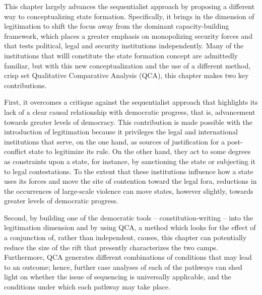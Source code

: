 \documentclass [11pt]{article}
\begin{document}
This chapter largely advances the sequentialist approach by proposing a different way to conceptualizing state formation. Specifically, it brings in the dimension of legitimation to shift the focus away from the dominant capacity-building framework, which places a greater emphasis on monopolizing security forces and that tests political, legal and security institutions independently. Many of the institutions that willl constitute the state formation concept are admittedly familiar, but with this new conceptualization and the use of a different method, crisp set Qualitative Comparative Analysis (QCA), this chapter makes two key contributions.

First, it overcomes a critique against the sequentialist approach that highlights its lack of a clear causal relationship with democratic progress, that is, advancement towards greater levels of democracy. This contribution is made possible with the introduction of legitimation because it privileges the legal and international institutions that serve, on the one hand, as sources of justification for a post-conflict state to legitimize its rule. On the other hand, they act to some degrees as constraints upon a state, for instance, by sanctioning the state or subjecting it to legal contestations. To the extent that these institutions influence how a state uses its forces and move the site of contention toward the legal fora, reductions in the occurrences of large-scale violence can move states, however slightly, towards greater levels of democratic progress.

Second, by building one of the democratic tools -- constitution-writing -- into the legitimation dimension and by using QCA, a method which looks for the effect of a conjunction of, rather than independent, causes, this chapter can potentially reduce the size of the rift that presently characterizes the two camps. Furthermore, QCA generates different combinations of conditions that may lead to an outcome; hence, further case analyses of each of the pathways can shed light on whether the issue of sequencing is universally applicable, and the conditions under which each pathway may take place.
\end{document}

